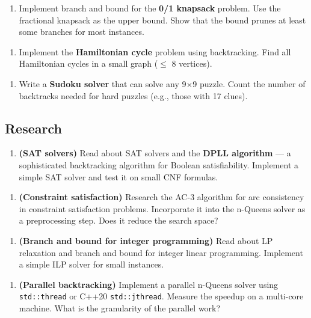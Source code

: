 \begin{enumerate}
\item Implement branch and bound for the \textbf{0/1 knapsack} problem. Use the fractional knapsack as the upper bound. Show that the bound prunes at least some branches for most instances.
\end{enumerate}

\begin{enumerate}
\item Implement the \textbf{Hamiltonian cycle} problem using backtracking. Find all Hamiltonian cycles in a small graph ($\le $ 8 vertices).
\end{enumerate}

\begin{enumerate}
\item Write a \textbf{Sudoku solver} that can solve any 9$\times $9 puzzle. Count the number of backtracks needed for hard puzzles (e.g., those with 17 clues).
\end{enumerate}

\subsection{Research}

\begin{enumerate}
\item \textbf{(SAT solvers)} Read about SAT solvers and the \textbf{DPLL algorithm} — a sophisticated backtracking algorithm for Boolean satisfiability. Implement a simple SAT solver and test it on small CNF formulas.
\end{enumerate}

\begin{enumerate}
\item \textbf{(Constraint satisfaction)} Research the AC-3 algorithm for arc consistency in constraint satisfaction problems. Incorporate it into the n-Queens solver as a preprocessing step. Does it reduce the search space?
\end{enumerate}

\begin{enumerate}
\item \textbf{(Branch and bound for integer programming)} Read about LP relaxation and branch and bound for integer linear programming. Implement a simple ILP solver for small instances.
\end{enumerate}

\begin{enumerate}
\item \textbf{(Parallel backtracking)} Implement a parallel n-Queens solver using \texttt{std::thread} or C++20 \texttt{std::jthread}. Measure the speedup on a multi-core machine. What is the granularity of the parallel work?
\end{enumerate}

